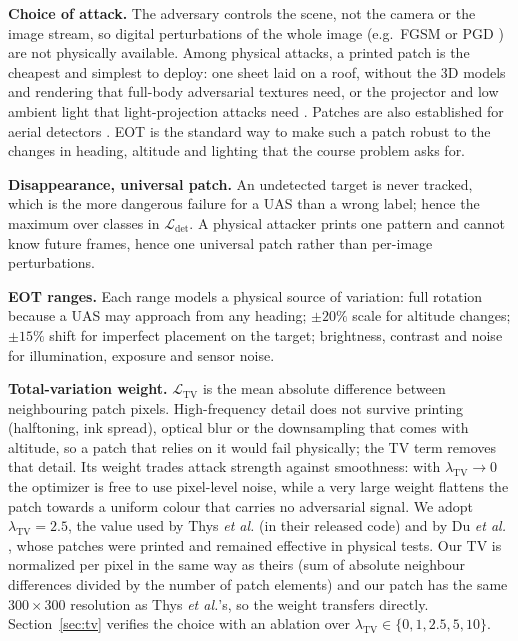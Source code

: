 \documentclass[conference]{IEEEtran}
\begin{document}
\textbf{Choice of attack.} The adversary controls the scene, not the camera or the image
stream, so digital perturbations of the whole image (e.g.\ FGSM or PGD
\cite{goodfellow2015explaining,madry2018towards}) are not physically available. Among physical
attacks, a printed patch is the cheapest and simplest to deploy: one sheet laid on a roof,
without the 3D models and rendering that full-body adversarial textures need, or the projector
and low ambient light that light-projection attacks need \cite{gnanasambandam2021optical}. Patches are
also established for aerial detectors \cite{denhollander2020adversarial,du2022physical}.
EOT \cite{athalye2018synthesizing} is the standard way to make such a patch robust to the
changes in heading, altitude and lighting that the course problem asks for.

\textbf{Disappearance, universal patch.} An undetected target is never tracked, which is the
more dangerous failure for a UAS than a wrong label; hence the maximum over classes in
$\mathcal{L}_{\text{det}}$. A physical attacker prints one pattern and cannot know future
frames, hence one universal patch rather than per-image perturbations.

\textbf{EOT ranges.} Each range models a physical source of variation: full rotation because
a UAS may approach from any heading; $\pm20\%$ scale for altitude changes; $\pm15\%$ shift for
imperfect placement on the target; brightness, contrast and noise for illumination, exposure
and sensor noise.

\textbf{Total-variation weight.} $\mathcal{L}_{\text{TV}}$ is the mean absolute difference
between neighbouring patch pixels. High-frequency detail does not survive printing (halftoning,
ink spread), optical blur or the downsampling that comes with altitude, so a patch that relies
on it would fail physically; the TV term removes that detail. Its weight trades attack
strength against smoothness: with $\lambda_{\text{TV}}\to0$ the optimizer is free to use
pixel-level noise, while a very large weight flattens the patch towards a uniform colour that
carries no adversarial signal. We adopt $\lambda_{\text{TV}}=2.5$, the value used by Thys
\emph{et al.} \cite{thys2019fooling} (in their released code) and by Du \emph{et al.}
\cite{du2022physical}, whose patches were printed and remained effective in physical tests.
Our TV is normalized per pixel in the same way as theirs (sum of absolute neighbour
differences divided by the number of patch elements) and our patch has the same
$300\times300$ resolution as Thys \emph{et al.}'s, so the weight transfers directly.
Section~\ref{sec:tv} verifies the choice with an ablation over
$\lambda_{\text{TV}}\in\{0,1,2.5,5,10\}$.
\end{document}
